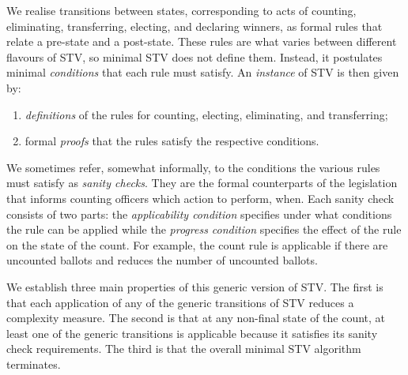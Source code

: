 \documentclass{llncs}
\begin{document}
We realise transitions between states, corresponding to acts of counting,
eliminating, transferring, electing, and declaring winners,
as formal rules that relate a pre-state and a
post-state. These rules are what varies between different flavours
of STV,
so
minimal STV does not define them.
Instead, it
postulates minimal \emph{conditions} that each rule must
satisfy. An \emph{instance} of STV is then given by:
\begin{enumerate}
\item \emph{definitions} of the rules for counting, electing,
eliminating, and transferring;
\item formal \emph{proofs} that the rules satisfy the respective
conditions.
\end{enumerate}

\noindent
We sometimes refer, somewhat informally, to the conditions the various rules must
satisfy as \emph{sanity checks}. They are the
formal counterparts of the legislation that informs counting officers
which action to perform, when. 
Each sanity check consists of two parts: 
the \emph{applicability condition}
specifies under what conditions the rule can be applied while
the \emph{progress condition} specifies the effect of the
rule on the state of the count.
For example, the count rule is applicable 
if there are uncounted ballots and reduces
the number of uncounted ballots.

We establish
three  main properties of this generic version of STV. The first
is that each application of any of the generic transitions
of STV 
reduces a complexity measure. The second is that at any
non-final state of the count, at least one of the generic
transitions is applicable because it satisfies its sanity
check requirements. The third is that the overall 
minimal STV algorithm terminates. 
\end{document}

